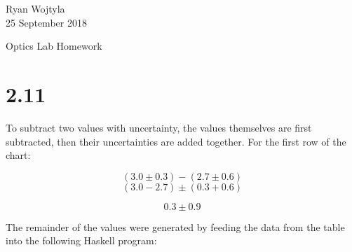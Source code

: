 \documentclass[12pt]{article}
\begin{document}




\hspace*{\fill} Ryan Wojtyla \\
\hspace*{\fill} 25 September 2018 \\

\begin{center}
  {\Large Optics Lab Homework} \\
\end{center}



\section*{2.11}

To subtract two values with uncertainty, the values themselves are first
subtracted, then their uncertainties are added together. For the first row of
the chart:

\[ (3.0 \pm 0.3) - (2.7 \pm 0.6) \]
\[ (3.0 - 2.7) \pm (0.3 + 0.6) \]

\begin{tcolorbox}[title=The first row of the new \( L - L^\prime \) column.]
  \[ 0.3 \pm 0.9 \]
\end{tcolorbox}

The remainder of the values were generated by feeding the data from the table
into the following Haskell program:


\end{document}
